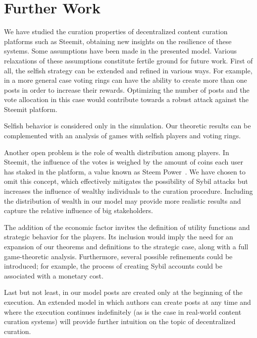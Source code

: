 \section{Further Work}

  We have studied the curation properties of decentralized content curation
  platforms such as Steemit, obtaining new insights on the resilience of these
  systems. Some assumptions have been made in the presented model. Various
  relaxations of these assumptions constitute fertile ground for future work.
  First of all, the selfish strategy can be extended and refined in various
  ways. For example, in a more general case voting rings can have the ability to
  create more than one posts in order to increase their rewards. Optimizing the
  number of posts and the vote allocation in this case would contribute towards
  a robust attack against the Steemit platform.

  Selfish behavior is considered only in the simulation. Our theoretic results
  can be complemented with an analysis of games with selfish players and voting
  rings.

  Another open problem is the role of wealth distribution among players. In
  Steemit, the influence of the votes is weighed by the amount of coins each
  user has staked in the platform, a value known as Steem Power~\cite{steemit}.
  We have chosen to omit this concept, which effectively mitigates the
  possibility of Sybil attacks but increases the influence of wealthy
  individuals to the curation procedure. Including the distribution of wealth in
  our model may provide more realistic results and capture the relative
  influence of big stakeholders.

  The addition of the economic factor invites the definition of utility
  functions and strategic behavior for the players. Its inclusion would imply
  the need for an expansion of our theorems and definitions to the strategic
  case, along with a full game-theoretic analysis. Furthermore, several possible
  refinements could be introduced; for example, the process of creating Sybil
  accounts could be associated with a monetary cost.

  Last but not least, in our model posts are created only at the beginning of
  the execution. An extended model in which authors can create posts at any time
  and where the execution continues indefinitely (as is the case in real-world
  content curation systems) will provide further intuition on the topic of
  decentralized curation.
